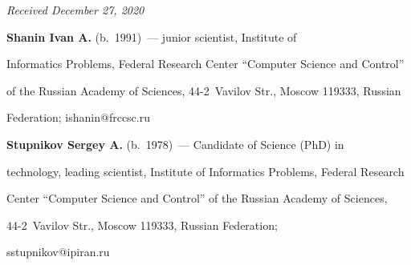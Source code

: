 


\hfill{\small\textit{Received December 27, 2020}} 




     

     \Contr

     

     \noindent

     \textbf{Shanin Ivan A.} (b.\ 1991)~--- junior scientist, Institute of 

Informatics Problems, Federal Research Center ``Computer Science and Control'' 

of the Russian Academy of Sciences, 44-2~Vavilov Str., Moscow 119333, Russian 

Federation; \mbox{ishanin@frccsc.ru}

     

     \vspace*{3pt}

     

     \noindent

     \textbf{Stupnikov Sergey A.} (b.\ 1978)~--- Candidate of Science (PhD) in 

technology, leading scientist, Institute of Informatics Problems, Federal Research 

Center ``Computer Science and Control'' of the Russian Academy of Sciences,  

44-2~Vavilov Str., Moscow 119333, Russian Federation; 

\mbox{sstupnikov@ipiran.ru}

    

  

    



\label{end\stat}



\renewcommand{\bibname}{\protect\rm Литература}

     

